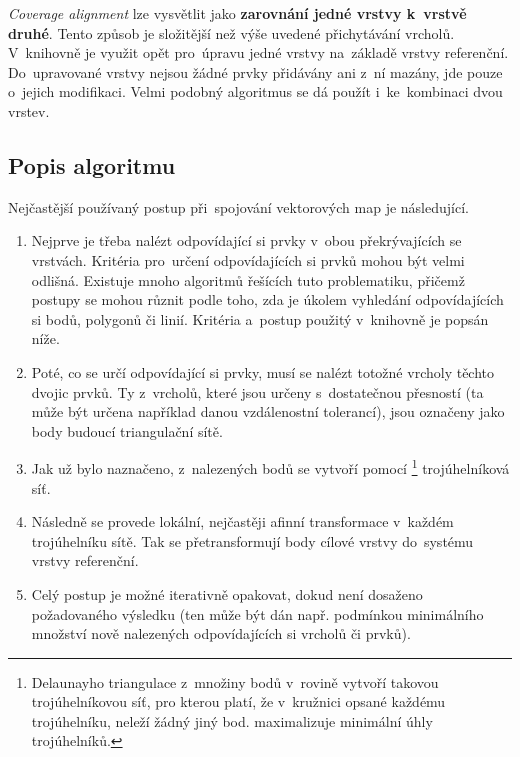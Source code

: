 \textit{Coverage alignment} lze vysvětlit jako \textbf{zarovnání jedné vrstvy 
k~vrstvě druhé}. Tento způsob je složitější než výše uvedené přichytávání vrcholů.
V~knihovně  je využit opět pro~úpravu jedné vrstvy na~základě vrstvy 
referenční. Do~upravované vrstvy nejsou žádné prvky přidávány ani z~ní mazány,
jde pouze o~jejich modifikaci. Velmi podobný algoritmus se dá použít 
i~ke~kombinaci dvou vrstev.

\subsection{Popis algoritmu}
\label{ca-algoritmus}

Nejčastější používaný postup při~spojování vektorových map je následující.

\begin{enumerate}
 \item Nejprve je třeba nalézt odpovídající si prvky v~obou překrývajících se 
    vrstvách. Kritéria pro~určení odpovídajících si prvků mohou být velmi 
    odlišná. Existuje mnoho algoritmů řešících tuto problematiku, přičemž 
    postupy se mohou různit podle toho, zda je úkolem vyhledání 
    odpovídajících si bodů, polygonů či linií. Kritéria a~postup použitý 
    v~knihovně  je popsán níže.
 \item Poté, co se určí odpovídající si prvky, musí se nalézt totožné vrcholy 
    těchto dvojic prvků. Ty z~vrcholů, které jsou určeny s~dostatečnou 
    přesností (ta může být určena například danou vzdálenostní tolerancí), 
    jsou označeny jako body budoucí triangulační sítě.
 \item Jak už bylo naznačeno, z~nalezených bodů se vytvoří pomocí 
    \footnote{Delaunayho triangulace z~množiny bodů v~rovině 
    vytvoří takovou trojúhelníkovou síť, pro kterou platí, že v~kružnici 
    opsané každému trojúhelníku, neleží žádný jiný bod.  maximalizuje
    minimální úhly trojúhelníků.} trojúhelníková síť. 
 \item Následně se provede lokální, nejčastěji afinní transformace v~každém 
    trojúhelníku sítě. Tak se přetransformují body cílové vrstvy do~systému 
    vrstvy referenční.
 \item Celý postup je možné iterativně opakovat, dokud není dosaženo 
    požadovaného výsledku (ten může být dán např. podmínkou minimálního 
    množství nově nale\-zených odpovídajících si vrcholů či prvků).
\end{enumerate}


